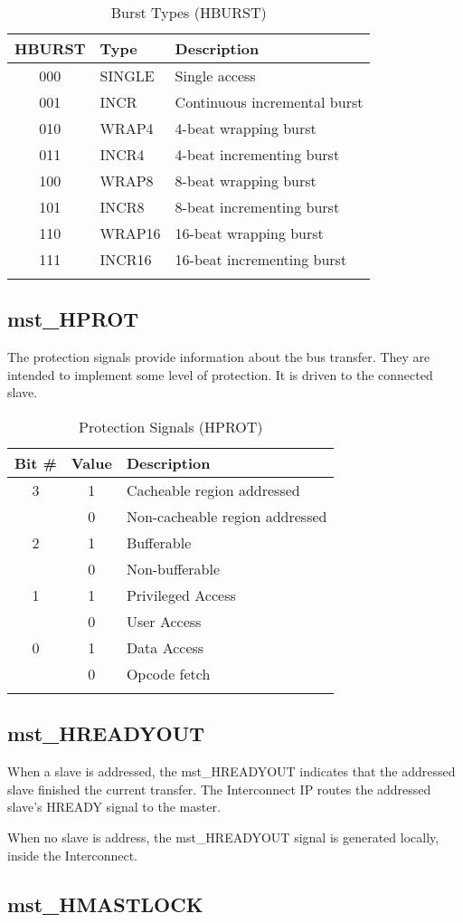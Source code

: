 \begin{longtable}[]{@{}cll@{}}
\toprule
HBURST & Type & Description\tabularnewline
\midrule
\endhead
000 & SINGLE & Single access\tabularnewline
001 & INCR & Continuous incremental burst\tabularnewline
010 & WRAP4 & 4-beat wrapping burst\tabularnewline
011 & INCR4 & 4-beat incrementing burst\tabularnewline
100 & WRAP8 & 8-beat wrapping burst\tabularnewline
101 & INCR8 & 8-beat incrementing burst\tabularnewline
110 & WRAP16 & 16-beat wrapping burst\tabularnewline
111 & INCR16 & 16-beat incrementing burst\tabularnewline
\bottomrule
\caption{Burst Types (HBURST)}
\end{longtable}

\subsection{mst\_HPROT}\label{mst_hprot}

The protection signals provide information about the bus transfer. They
are intended to implement some level of protection. It is driven to the
connected slave.

\begin{longtable}[]{@{}ccl@{}}
\toprule
Bit \# & Value & Description\tabularnewline
\midrule
\endhead
3 & 1 & Cacheable region addressed\tabularnewline
& 0 & Non-cacheable region addressed\tabularnewline
2 & 1 & Bufferable\tabularnewline
& 0 & Non-bufferable\tabularnewline
1 & 1 & Privileged Access\tabularnewline
& 0 & User Access\tabularnewline
0 & 1 & Data Access\tabularnewline
& 0 & Opcode fetch\tabularnewline
\bottomrule
\caption{Protection Signals (HPROT)}
\end{longtable}

\subsection{mst\_HREADYOUT}\label{mst_hreadyout}

When a slave is addressed, the mst\_HREADYOUT indicates that the
addressed slave finished the current transfer. The Interconnect IP
routes the addressed slave's HREADY signal to the master.

When no slave is address, the mst\_HREADYOUT signal is generated
locally, inside the Interconnect.

\subsection{mst\_HMASTLOCK}\label{mst_hmastlock}

